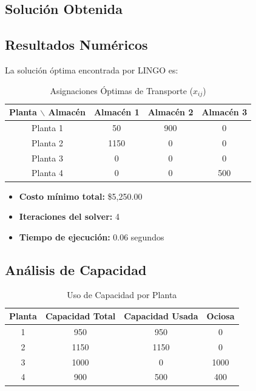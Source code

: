 \documentclass[12pt, a4paper, oneside]{book}
\theoremstyle{definition}
\begin{document}
\subsection{Solución Obtenida}

\subsection{Resultados Numéricos}
La solución óptima encontrada por LINGO es:

\begin{table}[h]
\centering
\caption{Asignaciones Óptimas de Transporte ($x_{ij}$)}
\begin{tabular}{|c|c|c|c|}
\hline
\textbf{Planta $\backslash$ Almacén} & \textbf{Almacén 1} & \textbf{Almacén 2} & \textbf{Almacén 3} \\ \hline
Planta 1 & 50 & 900 & 0 \\ \hline
Planta 2 & 1150 & 0 & 0 \\ \hline
Planta 3 & 0 & 0 & 0 \\ \hline
Planta 4 & 0 & 0 & 500 \\ \hline
\end{tabular}
\end{table}

\begin{itemize}
\item \textbf{Costo mínimo total:} \$5,250.00
\item \textbf{Iteraciones del solver:} 4
\item \textbf{Tiempo de ejecución:} 0.06 segundos
\end{itemize}

\subsection{Análisis de Capacidad}
\begin{table}[h]
\centering
\caption{Uso de Capacidad por Planta}
\begin{tabular}{|c|c|c|c|}
\hline
\textbf{Planta} & \textbf{Capacidad Total} & \textbf{Capacidad Usada} & \textbf{Ociosa} \\ \hline
1 & 950 & 950 & 0 \\ \hline
2 & 1150 & 1150 & 0 \\ \hline
3 & 1000 & 0 & 1000 \\ \hline
4 & 900 & 500 & 400 \\ \hline
\end{tabular}
\end{table}
\end{document}
